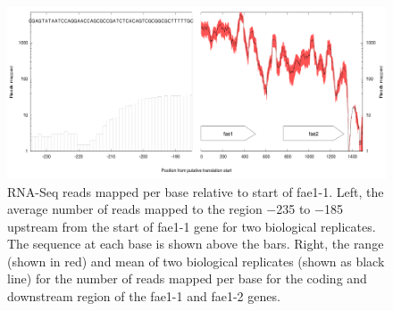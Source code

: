 \begin{figure}[H]
\centering
     \includegraphics[width=1.0\textwidth]{./tex/chapter1/figures/supplemental/FigureS5.png}
     \begin{singlespace}
     \caption[RNA-Seq reads mapped per base relative to start of fae1-1.]{
        RNA-Seq reads mapped per base relative to start of fae1-1.
        Left, the average number of reads mapped to the region −235 to −185 upstream from the start of fae1-1 gene for two biological replicates.
        The sequence at each base is shown above the bars.
        Right, the range (shown in red) and mean of two biological replicates (shown as black line) for the number of reads mapped per base for the coding and downstream region
            of the fae1-1 and fae1-2 genes.
        }
     \label{fig:S5}
     \end{singlespace}
\end{figure}


